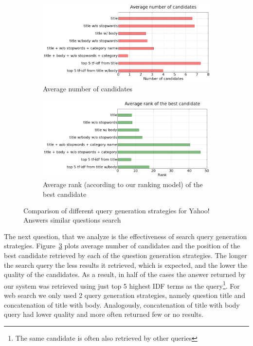 \begin{figure}
	\centering
	\begin{subfigure}[b]{0.49\textwidth}
		\centering
		\includegraphics[width=\textwidth]{img/liveqa_query_candidate_count}
		\caption{Average number of candidates}
		\label{figure:non-factoid:liveqa:analysis:query_generation:count}
	\end{subfigure}
	\begin{subfigure}[b]{0.49\textwidth}
		\centering
		\includegraphics[width=\textwidth]{img/liveqa_query_candidate_bestrank}
		\caption{Average rank (according to our ranking model) of the best candidate}
		\label{figure:non-factoid:liveqa:analysis:query_generation:rank}
	\end{subfigure}
	\caption{Comparison of different query generation strategies for Yahoo! Answers similar questions search}
	\label{figure:non-factoid:liveqa:analysis:query_generation}
\end{figure}

The next question, that we analyze is the effectiveness of search query generation strategies.
Figure~\ref{figure:non-factoid:liveqa:analysis:query_generation} plots average number of candidates and the position of the best candidate retrieved by each of the question generation strategies.
The longer the search query the less results it retrieved, which is expected, and the lower the quality of the candidates.
As a result, in half of the cases the answer returned by our system was retrieved using just top 5 highest IDF terms as the query\footnote{The same candidate is often also retrieved by other queries}.
For web search we only used 2 query generation strategies, namely question title and concatenation of title with body.
Analogously, concatenation of title with body query had lower quality and more often returned few or no results.

